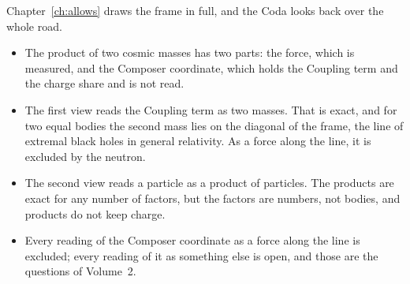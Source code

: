 Chapter~\ref{ch:allows} draws the frame in full, and the Coda looks back over the whole road.

\begin{plainwords}
\begin{itemize}
  \item The product of two cosmic masses has two parts: the force, which is measured, and the Composer coordinate, which holds the Coupling term and the charge share and is not read.
  \item The first view reads the Coupling term as two masses. That is exact, and for two equal bodies the second mass lies on the diagonal of the frame, the line of extremal black holes in general relativity. As a force along the line, it is excluded by the neutron.
  \item The second view reads a particle as a product of particles. The products are exact for any number of factors, but the factors are numbers, not bodies, and products do not keep charge.
  \item Every reading of the Composer coordinate as a force along the line is excluded; every reading of it as something else is open, and those are the questions of Volume~2.
\end{itemize}
\end{plainwords}

